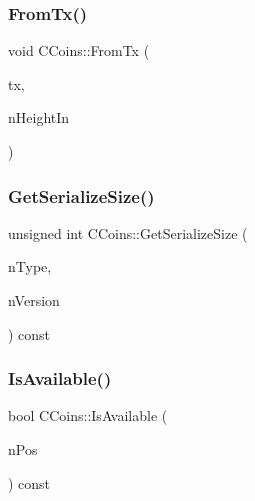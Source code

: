 \mbox{\label{class_c_coins_abf67e501a1d207c892c1f52dd383956e}} 
\subsubsection{\texorpdfstring{From\+Tx()}{FromTx()}}
{\footnotesize\ttfamily void C\+Coins\+::\+From\+Tx (\begin{DoxyParamCaption}\item[{const C\+Transaction \&}]{tx,  }\item[{int}]{n\+Height\+In }\end{DoxyParamCaption})\hspace{0.3cm}{\ttfamily [inline]}}

\mbox{\label{class_c_coins_a63916fcdb2305c47e6360cf533c27438}} 
\subsubsection{\texorpdfstring{Get\+Serialize\+Size()}{GetSerializeSize()}}
{\footnotesize\ttfamily unsigned int C\+Coins\+::\+Get\+Serialize\+Size (\begin{DoxyParamCaption}\item[{int}]{n\+Type,  }\item[{int}]{n\+Version }\end{DoxyParamCaption}) const\hspace{0.3cm}{\ttfamily [inline]}}

\mbox{\label{class_c_coins_aa645bc3d18f74e91430ac178a9d28ee4}} 
\subsubsection{\texorpdfstring{Is\+Available()}{IsAvailable()}}
{\footnotesize\ttfamily bool C\+Coins\+::\+Is\+Available (\begin{DoxyParamCaption}\item[{unsigned int}]{n\+Pos }\end{DoxyParamCaption}) const\hspace{0.3cm}{\ttfamily [inline]}}



